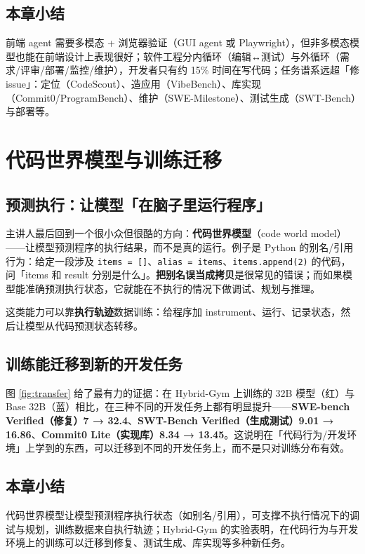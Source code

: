 ﻿\documentclass[a4paper]{article}
\begin{document}
\subsection{本章小结}
前端 agent 需要多模态 + 浏览器验证（GUI agent 或 Playwright），但非多模态模型也能在前端设计上表现很好；软件工程分内循环（编辑↔测试）与外循环（需求/评审/部署/监控/维护），开发者只有约 15\% 时间在写代码；任务谱系远超「修 issue」：定位（CodeScout）、造应用（VibeBench）、库实现（Commit0/ProgramBench）、维护（SWE-Milestone）、测试生成（SWT-Bench）与部署等。

\section{代码世界模型与训练迁移}

\subsection{预测执行：让模型「在脑子里运行程序」}

主讲人最后回到一个很小众但很酷的方向：\textbf{代码世界模型}（code world model）——让模型预测程序的执行结果，而不是真的运行。例子是 Python 的别名/引用行为：给定一段涉及 \texttt{items = []}、\texttt{alias = items}、\texttt{items.append(2)} 的代码，问「items 和 result 分别是什么」。\textbf{把别名误当成拷贝}是很常见的错误；而如果模型能准确预测执行状态，它就能在不执行的情况下做调试、规划与推理。

这类能力可以靠\textbf{执行轨迹}数据训练：给程序加 instrument、运行、记录状态，然后让模型从代码预测状态转移。

\subsection{训练能迁移到新的开发任务}

图 \ref{fig:transfer} 给了最有力的证据：在 Hybrid-Gym 上训练的 32B 模型（红）与 Base 32B（蓝）相比，在三种不同的开发任务上都有明显提升——\textbf{SWE-bench Verified（修复）7 → 32.4}、\textbf{SWT-Bench Verified（生成测试）9.01 → 16.86}、\textbf{Commit0 Lite（实现库）8.34 → 13.45}。这说明在「代码行为/开发环境」上学到的东西，可以迁移到不同的开发任务上，而不是只对训练分布有效。

\subsection{本章小结}
代码世界模型让模型预测程序执行状态（如别名/引用），可支撑不执行情况下的调试与规划，训练数据来自执行轨迹；Hybrid-Gym 的实验表明，在代码行为与开发环境上的训练可以迁移到修复、测试生成、库实现等多种新任务。
\end{document}
